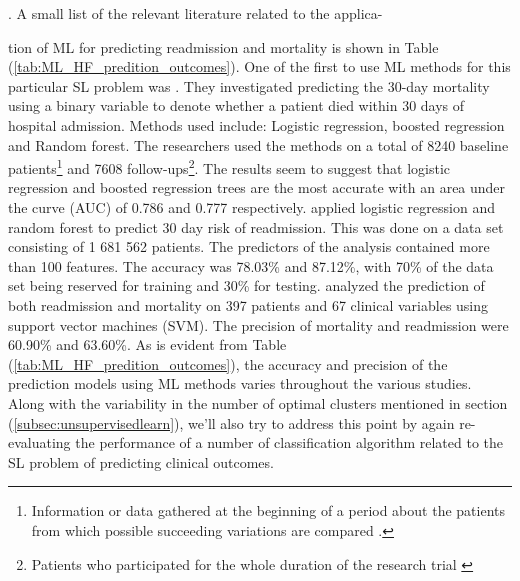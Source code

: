\documentclass[../thesis.tex]{subfiles}
\begin{document}
\citep{ketchum2011multivariate}. A small list of the relevant literature related to the applica-



\noindent tion of ML for predicting readmission and mortality is shown in Table (\ref{tab:ML_HF_predition_outcomes}). One of the first to use ML methods for this particular SL problem was \cite{austin2012regression}. They investigated predicting the 30-day mortality using a binary variable to denote whether a patient died within 30 days of hospital admission. Methods used include: Logistic regression, boosted regression and Random forest. The researchers used the methods on a total of 8240 baseline patients\footnote{Information or data gathered at the beginning of a period about the patients from which possible succeeding variations are compared \citep{martin2015concise}.} and 7608 follow-ups\footnote{Patients who participated for the whole duration of the research trial \citep{martin2015concise}}. The results seem to suggest that logistic regression and boosted regression trees are the most accurate with an area under the curve (AUC) of 0.786 and 0.777 respectively. \cite{zolfaghar2013big} applied logistic regression and random forest to predict 30 day risk of readmission. This was done on a data set consisting of 1 681 562 patients. The predictors of the analysis contained more than 100 features. The accuracy was 78.03\% and 87.12\%, with 70\% of the data set being reserved for training and 30\% for testing. \cite{shah2014phenomapping} analyzed the prediction of both readmission and mortality on 397 patients and 67 clinical variables using support vector machines (SVM). The precision of mortality and readmission were 60.90\% and 63.60\%. As is evident from Table (\ref{tab:ML_HF_predition_outcomes}), the accuracy and precision of the prediction models using ML methods varies throughout the various studies. Along with the variability in the number of optimal clusters mentioned in section (\ref{subsec:unsupervisedlearn}), we'll also try to address this point by again re-evaluating the performance of a number of classification algorithm related to the SL problem of predicting clinical outcomes. 
\end{document}
